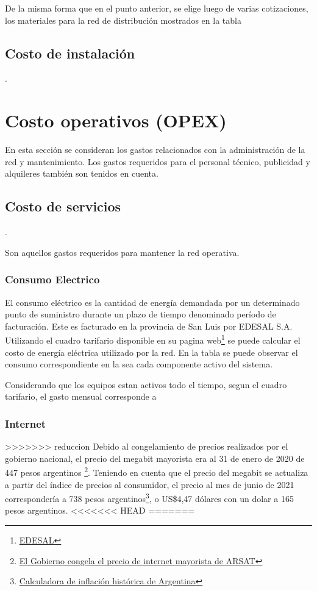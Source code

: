 \documentclass[11pt,a4paper]{article}
\begin{document}
De la misma forma que en el punto anterior, se elige luego de varias cotizaciones, los materiales para la red de distribución mostrados en la tabla 

\subsection{Costo de instalación}.



\section{Costo operativos (OPEX)}

En esta sección se consideran los gastos relacionados con la administración de la red y mantenimiento. Los gastos requeridos para el personal técnico, publicidad y alquileres también son tenidos en cuenta. 

\subsection{Costo de servicios}.

Son aquellos gastos requeridos para mantener la red operativa.

\subsubsection{Consumo Electrico}

El consumo eléctrico es la cantidad de energía demandada por un determinado punto de suministro durante un plazo de tiempo denominado período de facturación. Este es facturado en la provincia de San Luis por EDESAL S.A. Utilizando el cuadro tarifario disponible en su pagina web\footnote{\href{https://oficinavirtualedesal.com.ar/ove/html/simulacion.html}{EDESAL}} se puede calcular el costo de energía eléctrica utilizado por la red.
En la tabla se puede observar el consumo correspondiente en la sea cada componente activo del sistema.

Considerando que los equipos estan activos todo el tiempo, segun el cuadro tarifario, el gasto mensual corresponde a 

\subsubsection{Internet}

>>>>>>> reduccion
Debido al congelamiento de precios realizados por el gobierno nacional, el precio del megabit mayorista era al 31 de enero de 2020 de 447 pesos argentinos
\footnote{\href{https://www.argentina.gob.ar/noticias/el-gobierno-congela-el-precio-de-internet-mayorista-de-arsat\#:~:text=El\%20vicejefe\%20de\%20Gabinete\%20y,de\%20$447\%20pesos\%20por\%20mega.}{El Gobierno congela el precio de internet mayorista de ARSAT}}.
Teniendo en cuenta que el precio del megabit se actualiza a partir del índice de precios al consumidor, el precio al mes de junio de 2021 correspondería a 738 pesos argentinos\footnote{\href{https://calculadoradeinflacion.com/argentina.html?md=enero&ad=2020&mh=junio&ah=2021&q=447}{Calculadora de inflación
histórica de Argentina}}, o US\$4,47 dólares con un dolar a 165 pesos argentinos.
<<<<<<< HEAD
=======
\end{document}
